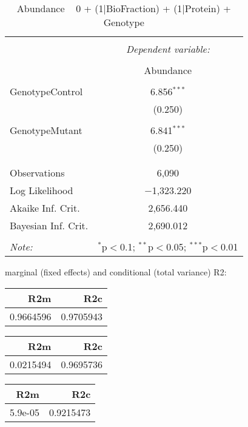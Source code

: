 \documentclass[11pt]{report}
\begin{document}
\begin{table}[!htbp] \centering 
  \caption{Abundance ~ 0 + (1|BioFraction) + (1|Protein) + Genotype} 
  \label{} 
\begin{tabular}{@{\extracolsep{5pt}}lc} 
\\[-1.8ex]\hline 
\hline \\[-1.8ex] 
 & \multicolumn{1}{c}{\textit{Dependent variable:}} \\ 
\cline{2-2} 
\\[-1.8ex] & Abundance \\ 
\hline \\[-1.8ex] 
 GenotypeControl & 6.856$^{***}$ \\ 
  & (0.250) \\ 
  & \\ 
 GenotypeMutant & 6.841$^{***}$ \\ 
  & (0.250) \\ 
  & \\ 
\hline \\[-1.8ex] 
Observations & 6,090 \\ 
Log Likelihood & $-$1,323.220 \\ 
Akaike Inf. Crit. & 2,656.440 \\ 
Bayesian Inf. Crit. & 2,690.012 \\ 
\hline 
\hline \\[-1.8ex] 
\textit{Note:}  & \multicolumn{1}{r}{$^{*}$p$<$0.1; $^{**}$p$<$0.05; $^{***}$p$<$0.01} \\ 
\end{tabular} 
\end{table} 
marginal (fixed effects) and conditional (total variance) R2:

\begin{tabular}{r|r}
\hline
R2m & R2c\\
\hline
0.9664596 & 0.9705943\\
\hline
\end{tabular}

\begin{tabular}{r|r}
\hline
R2m & R2c\\
\hline
0.0215494 & 0.9695736\\
\hline
\end{tabular}

\begin{tabular}{r|r}
\hline
R2m & R2c\\
\hline
5.9e-05 & 0.9215473\\
\hline
\end{tabular}
\end{document}
